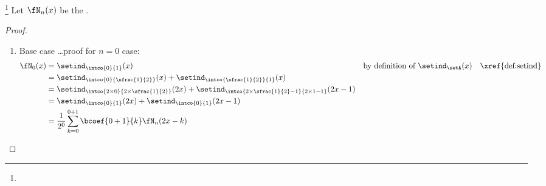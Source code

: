 \begin{theorem}
\footnote{
  }
\label{thm:bspline_2x}
Let $\fN_n(x)$ be the . %
\end{theorem}
\begin{proof}
\begin{enumerate}
  \item Base case \ldots proof for $n=0$ case:
    \begin{align*}
      \fN_0(x)
        &= \setind_\intco{0}{1}(x)
        && \text{by definition of $\setind_\setA(x)$}
        && \text{\xref{def:setind}}
      \\&= \setind_\intco{0}{\sfrac{1}{2}}(x) + \setind_\intco{\sfrac{1}{2}}{1}(x)
      \\&= \setind_\intco{2\times0}{2\times\sfrac{1}{2}}(2x) + \setind_\intco{2\times\sfrac{1}{2}-1}{2\times1-1}(2x-1)
      \\&= \setind_\intco{0}{1}(2x) + \setind_\intco{0}{1}(2x-1)
      \\&= \frac{1}{2^0}\sum_{k=0}^{0+1} \bcoef{0+1}{k} \fN_n(2x-k) 
    \end{align*}


\end{enumerate}
\end{proof}
